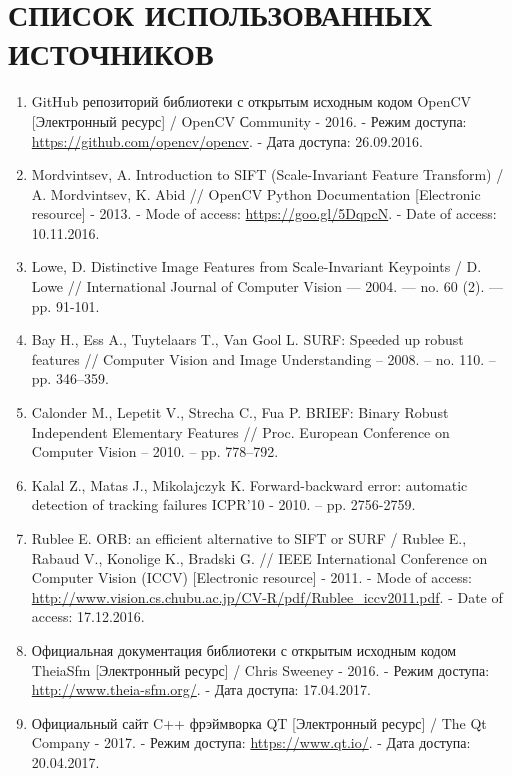\chapter*{СПИСОК ИСПОЛЬЗОВАННЫХ ИСТОЧНИКОВ}

\begin{enumerate}
    \item \label{itm:opencv} GitHub репозиторий библиотеки с открытым исходным кодом OpenCV [Электронный ресурс] / OpenCV Сommunity - 2016. - Режим доступа: \url{https://github.com/opencv/opencv}. - Дата доступа: 26.09.2016.
    
    \item \label{itm:sift} Mordvintsev, A. Introduction to SIFT (Scale-Invariant Feature Transform) / A. Mordvintsev, K. Abid // OpenCV Python Documentation [Electronic resource] - 2013. - Mode of access: \url{https://goo.gl/5DqpcN}. - Date of access: 10.11.2016.
    
    \item \label{itm:lowe} Lowe, D. Distinctive Image Features from Scale-Invariant Keypoints / D. Lowe // International Journal of Computer Vision — 2004. — no. 60 (2). — pp. 91-101.
    
    \item \label{itm:surf} Bay H., Ess A., Tuytelaars T., Van Gool L. SURF: Speeded up robust features // Computer Vision and Image Understanding – 2008. – no. 110. – pp. 346–359.
    
    \item \label{itm:brief} Calonder M., Lepetit V., Strecha C., Fua P. BRIEF: Binary Robust Independent Elementary Features // Proc. European Conference on Computer Vision – 2010. – pp. 778–792.
    
    \item \label{itm:gloh} Kalal Z., Matas J., Mikolajczyk K. Forward-backward error: automatic detection of tracking failures ICPR’10 - 2010. – pp. 2756-2759.
    
    \item \label{itm:orb} Rublee E. ORB: an efficient alternative to SIFT or SURF / Rublee E., Rabaud V., Konolige K., Bradski G. // IEEE International Conference on Computer Vision (ICCV) [Electronic resource] - 2011. - Mode of access: \url{http://www.vision.cs.chubu.ac.jp/CV-R/pdf/Rublee_iccv2011.pdf}. - Date of access: 17.12.2016.
    
    \item \label{itm:theia} Официальная документация библиотеки с открытым исходным кодом TheiaSfm [Электронный ресурс] / Chris Sweeney - 2016. - Режим доступа: \url{http://www.theia-sfm.org/}. - Дата доступа: 17.04.2017.
    
    \item \label{itm:last}\label{itm:qt} Официальный сайт C++ фрэймворка QT [Электронный ресурс] / The Qt Company - 2017. - Режим доступа: \url{https://www.qt.io/}. - Дата доступа: 20.04.2017.
\end{enumerate}

\newpage